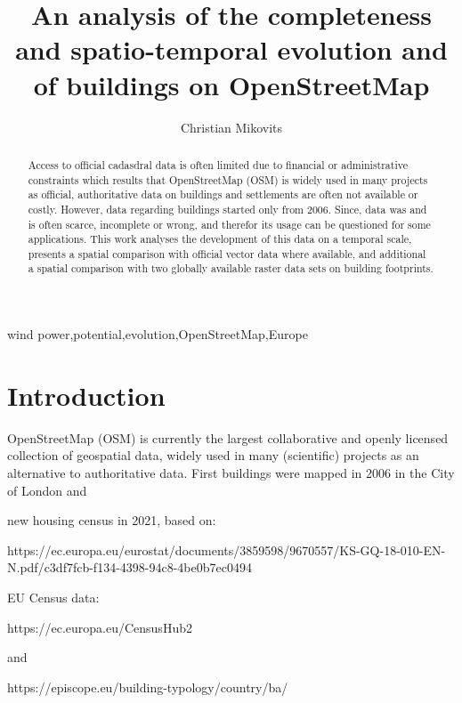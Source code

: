 \documentclass[final, 3p, times, 12pt]{elsarticle} %
\begin{document}
\begin{frontmatter}
    \title{An analysis of the completeness and spatio-temporal evolution and of buildings on OpenStreetMap}
    \author[1]{Christian Mikovits}
    \address[1]{Institute for Sustainable Economic Development, University of Natural Resources and Life Sciences,
    Feistmantelstrasse 4, 1180 Vienna, Austria}

    \begin{abstract}
        Access to official cadasdral data is often limited due to financial or administrative constraints which results that OpenStreetMap (OSM) is widely used in many projects as official, authoritative data on buildings and settlements are often not available or costly. However, data regarding buildings started only from 2006. Since, data was and is often scarce, incomplete or wrong, and therefor its usage can be questioned for some applications. This work analyses the development of this data on a temporal scale, presents a spatial comparison with official vector data where available, and additional a spatial comparison with two globally available raster data sets on building footprints.
    \end{abstract}
    \begin{keyword}
        wind power\sep potential\sep evolution\sep OpenStreetMap\sep Europe
    \end{keyword}
\end{frontmatter}
    
\newpage

\section{Introduction}\label{sec:introduction}
OpenStreetMap (OSM) is currently the largest collaborative and openly licensed collection of geospatial data, widely used in many (scientific) projects as an alternative to authoritative data. First buildings were mapped in 2006 in the City of London and 

new housing census in 2021, based on:

https://ec.europa.eu/eurostat/documents/3859598/9670557/KS-GQ-18-010-EN-N.pdf/c3df7fcb-f134-4398-94c8-4be0b7ec0494

EU Census data:

https://ec.europa.eu/CensusHub2

and

https://episcope.eu/building-typology/country/ba/
    
\end{document}
